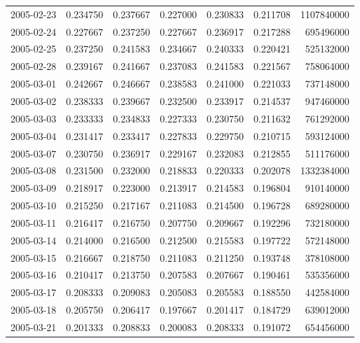 \begin{tabular}{lrrrrrr}
2005-02-23 &    0.234750 &    0.237667 &    0.227000 &    0.230833 &    0.211708 &  1107840000 \\
2005-02-24 &    0.227667 &    0.237250 &    0.227667 &    0.236917 &    0.217288 &   695496000 \\
2005-02-25 &    0.237250 &    0.241583 &    0.234667 &    0.240333 &    0.220421 &   525132000 \\
2005-02-28 &    0.239167 &    0.241667 &    0.237083 &    0.241583 &    0.221567 &   758064000 \\
2005-03-01 &    0.242667 &    0.246667 &    0.238583 &    0.241000 &    0.221033 &   737148000 \\
2005-03-02 &    0.238333 &    0.239667 &    0.232500 &    0.233917 &    0.214537 &   947460000 \\
2005-03-03 &    0.233333 &    0.234833 &    0.227333 &    0.230750 &    0.211632 &   761292000 \\
2005-03-04 &    0.231417 &    0.233417 &    0.227833 &    0.229750 &    0.210715 &   593124000 \\
2005-03-07 &    0.230750 &    0.236917 &    0.229167 &    0.232083 &    0.212855 &   511176000 \\
2005-03-08 &    0.231500 &    0.232000 &    0.218833 &    0.220333 &    0.202078 &  1332384000 \\
2005-03-09 &    0.218917 &    0.223000 &    0.213917 &    0.214583 &    0.196804 &   910140000 \\
2005-03-10 &    0.215250 &    0.217167 &    0.211083 &    0.214500 &    0.196728 &   689280000 \\
2005-03-11 &    0.216417 &    0.216750 &    0.207750 &    0.209667 &    0.192296 &   732180000 \\
2005-03-14 &    0.214000 &    0.216500 &    0.212500 &    0.215583 &    0.197722 &   572148000 \\
2005-03-15 &    0.216667 &    0.218750 &    0.211083 &    0.211250 &    0.193748 &   378108000 \\
2005-03-16 &    0.210417 &    0.213750 &    0.207583 &    0.207667 &    0.190461 &   535356000 \\
2005-03-17 &    0.208333 &    0.209083 &    0.205083 &    0.205583 &    0.188550 &   442584000 \\
2005-03-18 &    0.205750 &    0.206417 &    0.197667 &    0.201417 &    0.184729 &   639012000 \\
2005-03-21 &    0.201333 &    0.208833 &    0.200083 &    0.208333 &    0.191072 &   654456000 \\

\end{tabular}
